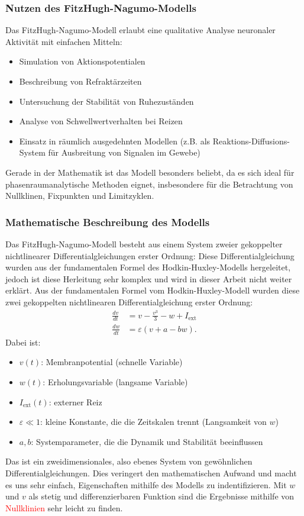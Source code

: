 \begin{refsection}
\subsubsection{Nutzen des FitzHugh-Nagumo-Modells}
Das FitzHugh-Nagumo-Modell erlaubt eine qualitative Analyse neuronaler Aktivität mit einfachen Mitteln:
\begin{itemize}
    \item Simulation von Aktionspotentialen
    \item Beschreibung von Refraktärzeiten
    \item Untersuchung der Stabilität von Ruhezuständen
    \item Analyse von Schwellwertverhalten bei Reizen
    \item Einsatz in räumlich ausgedehnten Modellen (z.B. als Reaktions-Diffusions-System für Ausbreitung von Signalen im Gewebe)
\end{itemize}

Gerade in der Mathematik ist das Modell besonders beliebt, da es sich ideal für phasenraumanalytische Methoden eignet, insbesondere für die Betrachtung von Nullklinen, Fixpunkten und Limitzyklen.
\subsubsection{Mathematische Beschreibung des Modells}
Das FitzHugh-Nagumo-Modell besteht aus einem System zweier gekoppelter nichtlinearer Differentialgleichungen erster Ordnung:
Diese Differentialgleichung wurden aus der fundamentalen Formel des Hodkin-Huxley-Modells hergeleitet, jedoch ist diese
Herleitung sehr komplex und wird in dieser Arbeit nicht weiter erklärt. 
Aus der fundamentalen Formel vom Hodkin-Huxley-Modell wurden diese zwei gekoppelten nichtlinearen Differentialgleichung erster
Ordnung:
\[
\begin{aligned}
	\frac{dv}{dt} &= v - \frac{v^3}{3} - w + I_{\text{ext}} \\
	\frac{dw}{dt} &= \varepsilon (v + a - b w).
\end{aligned}
\]
\noindent
Dabei ist:

\begin{itemize}
	\item $v(t)$: Membranpotential (schnelle Variable)
	\item $w(t)$: Erholungsvariable (langsame Variable)
	\item $I_{\text{ext}}(t)$: externer Reiz
	\item $\varepsilon \ll 1$: kleine Konstante, die die Zeitskalen trennt (Langsamkeit von $w$)
	\item $a, b$: Systemparameter, die die Dynamik und Stabilität beeinflussen
\end{itemize}
Das ist ein zweidimensionales, also ebenes System von gewöhnlichen Differentialgleichungen. Dies veringert den mathematischen Aufwand und macht es uns sehr einfach, Eigenschaften mithilfe des Modells zu indentifizieren.
Mit $w$ und $v$ als stetig und differenzierbaren Funktion sind die Ergebnisse mithilfe von \textcolor{red}{Nullklinien} sehr leicht zu
finden.


\end{refsection}
